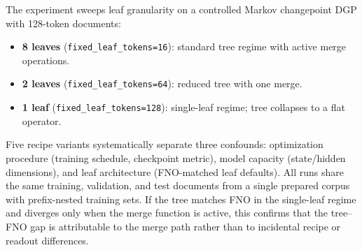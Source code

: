 The experiment sweeps leaf granularity on a controlled Markov changepoint DGP with 128-token documents:
\begin{itemize}[leftmargin=1.5em]
    \item \textbf{8 leaves} (\texttt{fixed\_leaf\_tokens=16}): standard tree regime with active merge operations.
    \item \textbf{2 leaves} (\texttt{fixed\_leaf\_tokens=64}): reduced tree with one merge.
    \item \textbf{1 leaf} (\texttt{fixed\_leaf\_tokens=128}): single-leaf regime; tree collapses to a flat operator.
\end{itemize}
Five recipe variants systematically separate three confounds: optimization procedure (training schedule, checkpoint metric), model capacity (state/hidden dimensions), and leaf architecture (FNO-matched leaf defaults). All runs share the same training, validation, and test documents from a single prepared corpus with prefix-nested training sets. If the tree matches FNO in the single-leaf regime and diverges only when the merge function is active, this confirms that the tree--FNO gap is attributable to the merge path rather than to incidental recipe or readout differences.
